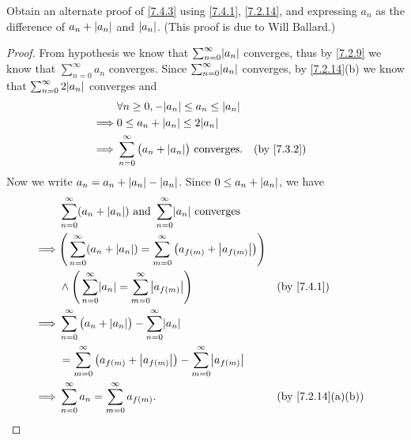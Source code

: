\begin{ex}\label{ex:7.4.2}
  Obtain an alternate proof of \cref{7.4.3} using \cref{7.4.1}, \cref{7.2.14}, and expressing \(a_n\) as the difference of \(a_n + \left\lvert a_n\right\rvert\) and \(\left\lvert a_n\right\rvert\).
  (This proof is due to Will Ballard.)
\end{ex}

\begin{proof}
  From hypothesis we know that \(\sum_{n = 0}^\infty \abs{a_n}\) converges, thus by \cref{7.2.9} we know that \(\sum_{n = 0}^\infty a_n\) converges.
  Since \(\sum_{n = 0}^\infty \abs{a_n}\) converges, by \cref{7.2.14}(b) we know that \(\sum_{n = 0}^\infty 2 \abs{a_n}\) converges and
  \begin{align*}
             & \forall n \geq 0, -\abs{a_n} \leq a_n \leq \abs{a_n}                             \\
    \implies & 0 \leq a_n + \abs{a_n} \leq 2\abs{a_n}                                           \\
    \implies & \sum_{n = 0}^\infty \big(a_n + \abs{a_n}\big) \text{ converges}. &  & \by{7.3.2}
  \end{align*}
  Now we write \(a_n = a_n + \left\lvert a_n\right\rvert - \left\lvert a_n\right\rvert\).
  Since \(0 \leq a_n + \left\lvert a_n\right\rvert\), we have
  \begin{align*}
             & \sum_{n = 0}^\infty (a_n + \abs{a_n}) \text{ and } \sum_{n = 0}^\infty \abs{a_n} \text{ converges}                                               \\
    \implies & \Bigg(\sum_{n = 0}^\infty (a_n + \abs{a_n}) = \sum_{m = 0}^\infty \big(a_{f(m)} + \abs{a_{f(m)}}\big)\Bigg)                                      \\
             & \land \Bigg(\sum_{n = 0}^\infty \abs{a_n} = \sum_{m = 0}^\infty \abs{a_{f(m)}}\Bigg)                        &  & \by{7.4.1}                      \\
    \implies & \sum_{n = 0}^\infty \big(a_n + \abs{a_n}\big) - \sum_{n = 0}^\infty \abs{a_n}                                                                    \\
             & = \sum_{m = 0}^\infty \big(a_{f(m)} + \abs{a_{f(m)}}\big) - \sum_{m = 0}^\infty \abs{a_{f(m)}}                                                   \\
    \implies & \sum_{n = 0}^\infty a_n = \sum_{m = 0}^\infty a_{f(m)}.                                                     &  & \text{(by \cref{7.2.14}(a)(b))}
  \end{align*}
\end{proof}
